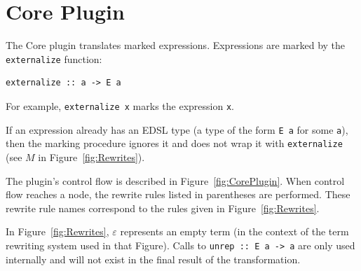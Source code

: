 \documentclass[runningheads, a4paper]{llncs}
\newcommand{\ttt}{\texttt}
\begin{document}


\section{Core Plugin}
\label{sec:CorePlugin}

The Core plugin translates marked expressions. Expressions are marked by
the \ttt{externalize} function:

\begin{lstlisting}
externalize :: a -> E a
\end{lstlisting}

For example, \ttt{externalize x} marks the expression \ttt{x}.

If an expression already has an EDSL type (a type of the form \ttt{E a} for some
\ttt{a}), then the marking procedure ignores it and does not wrap it with
\ttt{externalize} (see $M$ in Figure~\ref{fig:Rewrites}).

The plugin's control flow is described in Figure~\ref{fig:CorePlugin}. When control
flow reaches a node, the rewrite rules listed in parentheses are performed. These rewrite
rule names correspond to the rules given in Figure~\ref{fig:Rewrites}.


In Figure~\ref{fig:Rewrites},
$\varepsilon$ represents an empty term (in the context of the term rewriting system used in that Figure). Calls
to \ttt{unrep :: E a -> a} are only used internally and will not exist in
the final result of the transformation.
\end{document}
